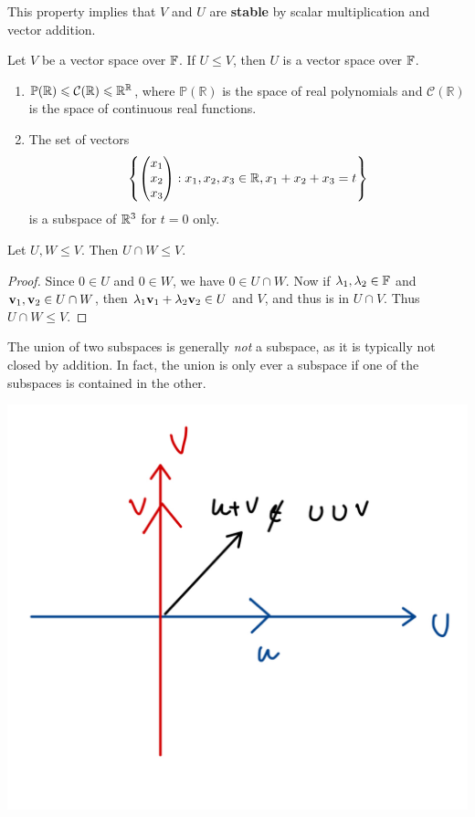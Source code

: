 \documentclass[a4paper]{article}
\begin{document}
This property implies that $V$ and $U$ are \textbf{stable} by scalar multiplication and vector addition.
\begin{proposition}
    Let $ V $ be a vector space over ${\mathbb{F}}$. If $ U\le V $, then $U$ is a vector space over ${\mathbb{F}}$.
\end{proposition}
\begin{example}
    \begin{enumerate}
        \item $ \mathbb{P}({\mathbb{R}})\leqslant {\mathcal{C}}({\mathbb{R}})\leqslant \mathbb{R} ^\mathbb{R}  $, where $ \mathbb{P}(\mathbb{R}) $ is the space of real polynomials and $ \mathcal{C}(\mathbb{R}) $ is the space of continuous real functions.
        \item The set of vectors
        $$
        \left\{\begin{pmatrix}x_1 \\ x_2 \\ x_3\end{pmatrix} : x_1, x_2, x_3 \in {\mathbb{R}}, x_1 + x_2 + x_3 = t\right\}
        $$
        is a subspace of ${\mathbb{R}}^3$ for $t = 0$ only.
    \end{enumerate}
\end{example}
\begin{proposition}
    Let $U, W \le V$. Then $U \cap W \le V$.
\end{proposition}
\begin{proof}
    Since $0 \in U$ and $0 \in W$, we have $0 \in U \cap W$. Now if $\lambda_1, \lambda_2 \in {\mathbb{F}}$ and ${\bf v}_1, {\bf v}_2 \in U \cap W$, then $\lambda_1 {\bf v}_1 + \lambda_2 {\bf v}_2 \in U$ and $V$, and thus is in $U \cap V$. Thus $U \cap W \le V$.
\end{proof}
The union of two subspaces is generally \emph{not} a subspace, as it is typically not closed by addition. In fact, the union is only ever a subspace if one of the subspaces is contained in the other. 
\begin{center}
    \includegraphics[scale=0.13]{la1.jpeg}
\end{center}
\end{document}
